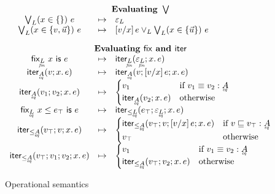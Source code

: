 \begin{figure*}
\begin{displaymath}
\begin{array}{ccl}
    \end{array}
    \begin{array}{ccl}

      \multicolumn{3}{c}{\textbf{Evaluating }\bigvee}\\
      \tforin{L}{x \in \{\}} e &\step& \unit_L\\
      \tforin{L}{x \in \setlit{v, \vec{u}}} e
      &\step& \sub{v/x} e \vee_L \tforin{L}{x \in \setlit{\vec{u}}} e

      \vspace{1em}\\
      \multicolumn{3}{c}{\textbf{Evaluating \ms{fix} and \ms{iter}}}\\
      \tfix{\fineq{L}}{x}{e} &\step& \iter{\fineq{L}}{\unit_{\fineq{L}}}{x}{e}\\
      \iter{\eq{A}}{v}{x}{e} &\step& \iterstep{\eq{A}}{v}{\sub{v/x} e}{x}{e}\\
      \iterstep{\eq{A}}{v_1}{v_2}{x}{e}
      &\step& \begin{cases}
        v_1 & \text{if}~{v_1 \aeq v_2 : \eq{A}}\\
        \iter{\eq{A}}{v_2}{x}{e} & \text{otherwise}
      \end{cases}\\
      \tfixle{\eq{L}}{x}{e_\top}{e} &\step& \iterle{\eq{L}}{e_\top}{\unit_{\eq{L}}}{x}{e}\\
      \iterle{\eq{A}}{v_\top}{v}{x}{e}
      &\step& \begin{cases}
        \iterlestep{\eq{A}}{v_\top}{v}{\sub{v/x} e}{x}{e} & \text{if}~{v \ale v_\top : \eq{A}}\\
        v_\top & \text{otherwise}
      \end{cases}\\
      \iterlestep{\eq{A}}{v_\top}{v_1}{v_2}{x}{e}
      &\step& \begin{cases}
        v_1 &\text{if}~{v_1 \aeq v_2 : \eq{A}}\\
        \iterle{\eq{A}}{v_\top}{v_2}{x}{e} & \text{otherwise}
      \end{cases}
    \end{array}
  \end{displaymath}

  \caption{Operational semantics}
  \label{fig:opsem}
\end{figure*}

